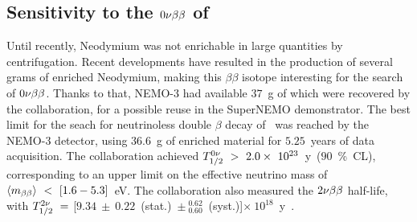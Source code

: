 \subsection{Sensitivity to the $0\nu\beta\beta$ of \Nd}

Until recently, Neodymium was not enrichable in large quantities by centrifugation.
Recent developments have resulted in the production of several grams of enriched Neodymium, making this $\beta\beta$ isotope interesting for the search of $0\nu\beta\beta$.
Thanks to that, NEMO-$3$ had available $37$~g of \Nd which were recovered by the collaboration, for a possible reuse in the SuperNEMO demonstrator.
The best limit for the seach for neutrinoless double $\beta$ decay of \Nd\ was reached by the NEMO-$3$ detector, using $36.6$~g of enriched material for $5.25$~years of data acquisition.
The collaboration achieved $T_{1/2}^{0\nu}~>~2.0\times~10^{23}$~y~($90$~\%~CL), corresponding to an upper limit on the effective neutrino mass of $\langle m_{\beta\beta}\rangle~<~[1.6-5.3]$~eV.
The collaboration also measured the $2\nu\beta\beta$ half-life, with $T_{1/2}^{2\nu}~=~$[$9.34~\pm~0.22$~(stat.)~$\pm~^{0.62}_{0.60}$~(syst.)]$\times~10^{18}$~y~\cite{art:NEMO3_Nd}.

